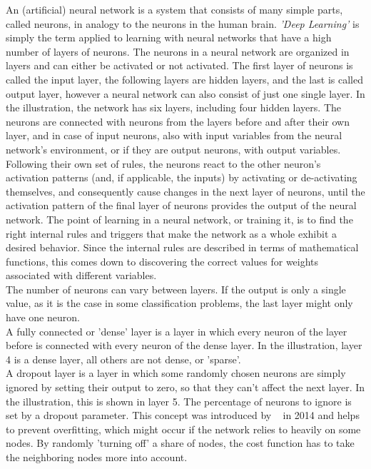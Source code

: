 \documentclass[
	a4paper,
	pagesize,
	pdftex,
	12pt,
	twoside, %
	BCOR=5mm, %
	ngerman,
	fleqn,
	final,
	]{scrartcl}
\begin{document}
An (artificial) neural network is a system that consists of many simple parts, called neurons, in analogy to the neurons in the human brain. \textit{'Deep Learning'} is simply the term applied to learning with neural networks that have a high number of layers of neurons. The neurons in a neural network are organized in layers and can either be activated or not activated. The first layer of neurons is called the input layer, the following layers are hidden layers, and the last is called output layer, however a neural network can also consist of just one single layer. In the illustration, the network has six layers, including four hidden layers. The neurons are connected with neurons from the layers before and after their own layer, and in case of input neurons, also with input variables from the neural network's environment, or if they are output neurons, with output variables. Following their own set of rules, the neurons react to the other neuron's activation patterns (and, if applicable, the inputs) by activating or de-activating themselves, and consequently cause changes in the next layer of neurons, until the activation pattern of the final layer of neurons provides the output of the neural network. The point of learning in a neural network, or training it, is to find the right internal rules and triggers that make the network as a whole exhibit a desired behavior. Since the internal rules are described in terms of mathematical functions, this comes down to discovering the correct values for weights associated with different variables.\\
The number of neurons can vary between layers. If the output is only a single value, as it is the case in some classification problems, the last layer might only have one neuron.\\
A fully connected or 'dense' layer is a layer in which every neuron of the layer before is connected with every neuron of the dense layer. In the illustration, layer 4 is a dense layer, all others are not dense, or 'sparse'.\\
A dropout layer is a layer in which some randomly chosen neurons are simply ignored by setting their output to zero, so that they can't affect the next layer. In the illustration, this is shown in layer 5. The percentage of neurons to ignore is set by a dropout parameter. This concept was introduced by ~\cite{Srivastava.2014} in 2014 and helps to prevent overfitting, which might occur if the network relies to heavily on some nodes. By randomly 'turning off' a share of nodes, the cost function has to take the neighboring nodes more into account.\\
\end{document}
